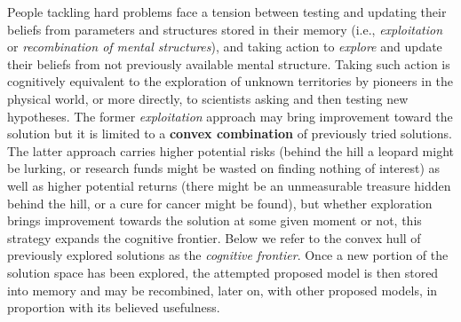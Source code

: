 People tackling hard problems face a tension between testing and updating their beliefs from parameters and structures stored in their memory (i.e., {\it exploitation} or {\it recombination of mental structures}), and taking action to {\it explore} and update their beliefs from not previously available mental structure. Taking such action is cognitively equivalent to the exploration of unknown territories by pioneers in the physical world, or more directly, to scientists asking and then testing new hypotheses. The former {\it exploitation} approach may bring improvement toward the solution but it is limited to a {\bf convex combination} of previously tried solutions. The latter approach carries higher potential risks (behind the hill a leopard might be lurking, or research funds might be wasted on finding nothing of interest) as well as higher potential returns (there might be an unmeasurable treasure hidden behind the hill, or a cure for cancer might be found), but whether exploration brings improvement towards the solution at some given moment or not, this strategy expands the cognitive frontier. Below we refer to the convex hull of previously explored solutions as the {\it cognitive frontier}.  Once a new portion of the solution space has been explored, the attempted proposed model is then stored into memory and may be recombined, later on, with other proposed models, in proportion with its believed usefulness. \\
